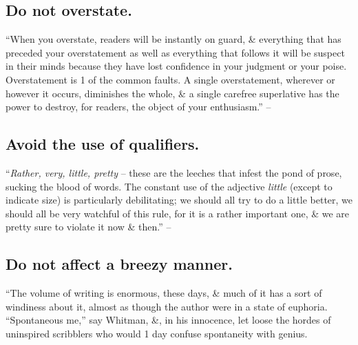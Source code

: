 \documentclass{article}
\numberwithin{equation}{section}
\begin{document}

\subsection{Do not overstate.}
``When you overstate, readers will be instantly on guard, \& everything that has preceded your overstatement as well as everything that follows it will be suspect in their minds because they have lost confidence in your judgment or your poise. Overstatement is 1 of the common faults. A single overstatement, wherever or however it occurs, diminishes the whole, \& a single carefree superlative has the power to destroy, for readers, the object of your enthusiasm.'' -- \cite[p. 84]{Strunk_White2019}


\subsection{Avoid the use of qualifiers.}
``\textit{Rather, very, little, pretty} -- these are the leeches that infest the pond of prose, sucking the blood of words. The constant use of the adjective \textit{little} (except to indicate size) is particularly debilitating; we should all try to do a little better, we should all be very watchful of this rule, for it is a rather important one, \& we are pretty sure to violate it now \& then.'' -- \cite[p. 85]{Strunk_White2019}


\subsection{Do not affect a breezy manner.}
``The volume of writing is enormous, these days, \& much of it has a sort of windiness about it, almost as though the author were in a state of euphoria. ``Spontaneous me,'' say Whitman, \&, in his innocence, let loose the hordes of uninspired scribblers who would 1 day confuse spontaneity with genius.
\end{document}
